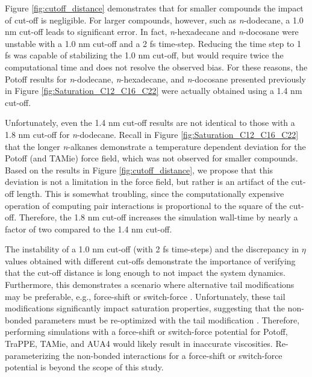 \documentclass[preprint,review,12pt]{elsarticle}
\begin{document}
%	
	Figure \ref{fig:cutoff_distance} demonstrates that for smaller compounds the impact of cut-off is negligible. For larger compounds, however, such as \textit{n}-dodecane, a 1.0 nm cut-off leads to significant error. In fact, \textit{n}-hexadecane and \textit{n}-docosane were unstable with a 1.0 nm cut-off and a 2 fs time-step. Reducing the time step to 1 fs was capable of stabilizing the 1.0 nm cut-off, but would require twice the computational time and does not resolve the observed bias. For these reasons, the Potoff results for \textit{n}-dodecane, \textit{n}-hexadecane, and \textit{n}-docosane presented previously in Figure \ref{fig:Saturation_C12_C16_C22} were actually obtained using a 1.4 nm cut-off.
	
	Unfortunately, even the 1.4 nm cut-off results are not identical to those with a 1.8 nm cut-off for \textit{n}-dodecane. Recall in Figure \ref{fig:Saturation_C12_C16_C22} that the longer \textit{n}-alkanes demonstrate a temperature dependent deviation for the Potoff (and TAMie) force field, which was not observed for smaller compounds. Based on the results in Figure \ref{fig:cutoff_distance}, we propose that this deviation is not a limitation in the force field, but rather is an artifact of the cut-off length. This is somewhat troubling, since the computationally expensive operation of computing pair interactions is proportional to the square of the cut-off. Therefore, the 1.8 nm cut-off increases the simulation wall-time by nearly a factor of two compared to the 1.4 nm cut-off.
		
	
	
	
	
	The instability of a 1.0 nm cut-off (with 2 fs time-steps) and the discrepancy in $\eta$ values obtained with different cut-offs demonstrate the importance of verifying that the cut-off distance is long enough to not impact the system dynamics. Furthermore, this demonstrates a scenario where alternative tail modifications may be preferable, e.g., force-shift or switch-force \cite{GROMACS_2018}. Unfortunately, these tail modifications significantly impact saturation properties, suggesting that the non-bonded parameters must be re-optimized with the tail modification \cite{Thol_LJTS,Thol2016_LJ}. Therefore, performing simulations with a force-shift or switch-force potential for Potoff, TraPPE, TAMie, and AUA4 would likely result in inaccurate viscosities. Re-parameterizing the non-bonded interactions for a force-shift or switch-force potential is beyond the scope of this study.
	
\end{document}
